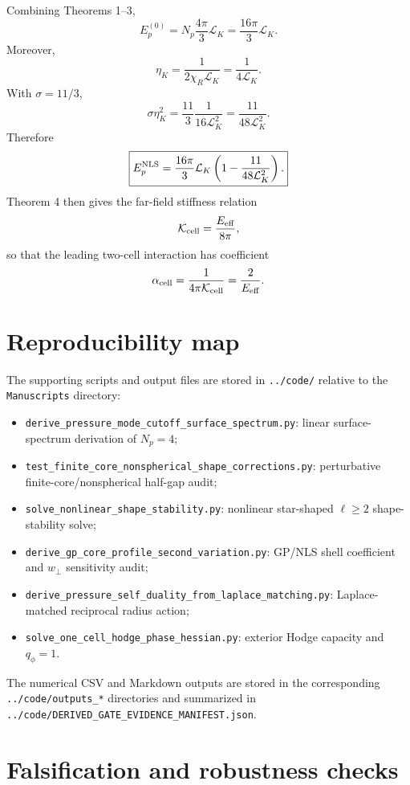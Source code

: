 \documentclass[11pt]{article}
\newcommand{\LK}{\mathcal L_K}
\newcommand{\Kcell}{\mathcal K_{\rm cell}}
\newcommand{\Eeff}{E_{\rm eff}}
\newcommand{\EpNLS}{E_p^{\rm NLS}}
\newcommand{\alphacell}{\alpha_{\rm cell}}
\begin{document}
Combining Theorems 1--3,
\[
  E_p^{(0)}
  =
  N_p\frac{4\pi}{3}\LK
  =
  \frac{16\pi}{3}\LK.
\]
Moreover,
\[
  \eta_K
  =
  \frac{1}{2\chi_R\LK}
  =
  \frac{1}{4\LK}.
\]
With \(\sigma=11/3\),
\[
  \sigma\eta_K^2
  =
  \frac{11}{3}\frac{1}{16\LK^2}
  =
  \frac{11}{48\LK^2}.
\]
Therefore
\[
  \boxed{
  \EpNLS
  =
  \frac{16\pi}{3}\LK
  \left(
  1-\frac{11}{48\LK^2}
  \right).
  }
\]
Theorem 4 then gives the far-field stiffness relation
\[
  \Kcell=\frac{\Eeff}{8\pi},
\]
so that the leading two-cell interaction has coefficient
\[
  \alphacell
  =
  \frac{1}{4\pi\Kcell}
  =
  \frac{2}{\Eeff}.
\]


\section{Reproducibility map}

The supporting scripts and output files are stored in \texttt{../code/} relative
to the \texttt{Manuscripts} directory:
\begin{itemize}
\item \texttt{derive\_pressure\_mode\_cutoff\_surface\_spectrum.py}:
linear surface-spectrum derivation of \(N_p=4\);
\item \texttt{test\_finite\_core\_nonspherical\_shape\_corrections.py}:
perturbative finite-core/nonspherical half-gap audit;
\item \texttt{solve\_nonlinear\_shape\_stability.py}:
nonlinear star-shaped \(\ell\ge2\) shape-stability solve;
\item \texttt{derive\_gp\_core\_profile\_second\_variation.py}:
GP/NLS shell coefficient and \(w_\perp\) sensitivity audit;
\item \texttt{derive\_pressure\_self\_duality\_from\_laplace\_matching.py}:
Laplace-matched reciprocal radius action;
\item \texttt{solve\_one\_cell\_hodge\_phase\_hessian.py}:
exterior Hodge capacity and \(q_\phi=1\).
\end{itemize}
The numerical CSV and Markdown outputs are stored in the corresponding
\texttt{../code/outputs\_*} directories and summarized in
\texttt{../code/DERIVED\_GATE\_EVIDENCE\_MANIFEST.json}.

\section{Falsification and robustness checks}
\end{document}
